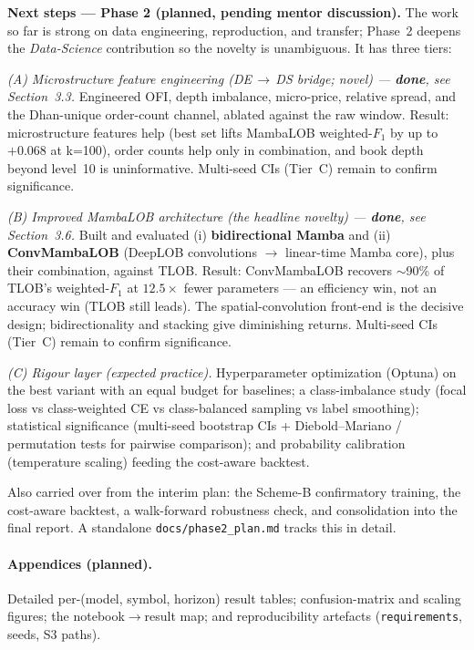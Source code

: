 \documentclass[11pt]{article}
\begin{document}
\medskip\noindent\textbf{Next steps --- Phase 2 (planned, pending mentor discussion).} The work so far is
strong on data engineering, reproduction, and transfer; Phase~2 deepens the \emph{Data-Science} contribution
so the novelty is unambiguous. It has three tiers:

\noindent\emph{(A) Microstructure feature engineering (DE\,$\rightarrow$\,DS bridge; novel) --- \textbf{done},
see Section~3.3.} Engineered OFI, depth imbalance, micro-price, relative spread, and the Dhan-unique
order-count channel, ablated against the raw window. Result: microstructure features help (best set lifts
MambaLOB weighted-$F_1$ by up to $+0.068$ at k=100), order counts help only in combination, and book depth
beyond level~10 is uninformative. Multi-seed CIs (Tier~C) remain to confirm significance.

\noindent\emph{(B) Improved MambaLOB architecture (the headline novelty) --- \textbf{done}, see Section~3.6.}
Built and evaluated (i) \textbf{bidirectional Mamba} and (ii) \textbf{ConvMambaLOB} (DeepLOB convolutions
$\rightarrow$ linear-time Mamba core), plus their combination, against TLOB. Result: ConvMambaLOB recovers
$\sim$90\% of TLOB's weighted-$F_1$ at $12.5\times$ fewer parameters --- an efficiency win, not an accuracy
win (TLOB still leads). The spatial-convolution front-end is the decisive design; bidirectionality and
stacking give diminishing returns. Multi-seed CIs (Tier~C) remain to confirm significance.

\noindent\emph{(C) Rigour layer (expected practice).} Hyperparameter optimization (Optuna) on the best
variant with an equal budget for baselines; a class-imbalance study (focal loss vs class-weighted CE vs
class-balanced sampling vs label smoothing); statistical significance (multi-seed bootstrap CIs +
Diebold--Mariano / permutation tests for pairwise comparison); and probability calibration (temperature
scaling) feeding the cost-aware backtest.

\noindent Also carried over from the interim plan: the Scheme-B confirmatory training, the cost-aware
backtest, a walk-forward robustness check, and consolidation into the final report. A standalone
\texttt{docs/phase2\_plan.md} tracks this in detail.

\paragraph{Appendices (planned).} Detailed per-(model, symbol, horizon) result tables; confusion-matrix and
scaling figures; the notebook$\rightarrow$result map; and reproducibility artefacts (\texttt{requirements},
seeds, S3 paths).
\end{document}
